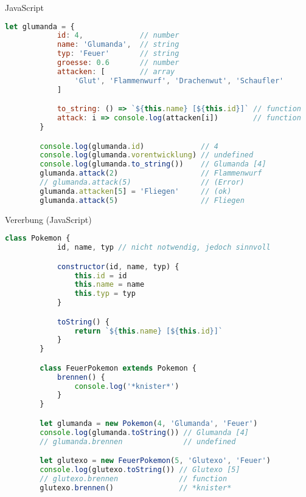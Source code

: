\begin{example}{JavaScript}
    \begin{lstlisting}[language=JavaScript]
        let glumanda = {
            id: 4,             // number
            name: 'Glumanda',  // string
            typ: 'Feuer'       // string
            groesse: 0.6       // number
            attacken: [        // array
                'Glut', 'Flammenwurf', 'Drachenwut', 'Schaufler'
            ]

            to_string: () => `${this.name} [${this.id}]` // function
            attack: i => console.log(attacken[i])        // function
        }

        console.log(glumanda.id)             // 4
        console.log(glumanda.vorentwicklung) // undefined
        console.log(glumanda.to_string())    // Glumanda [4]
        glumanda.attack(2)                   // Flammenwurf
        // glumanda.attack(5)                // (Error)
        glumanda.attacken[5] = 'Fliegen'     // (ok)
        glumanda.attack(5)                   // Fliegen
    \end{lstlisting}
\end{example}

\begin{example}{Vererbung (JavaScript)}
    \begin{lstlisting}[language=JavaScript]
        class Pokemon {
            id, name, typ // nicht notwendig, jedoch sinnvoll

            constructor(id, name, typ) {
                this.id = id
                this.name = name
                this.typ = typ
            }

            toString() {
                return `${this.name} [${this.id}]`
            }
        }

        class FeuerPokemon extends Pokemon {
            brennen() {
                console.log('*knister*')
            }
        }

        let glumanda = new Pokemon(4, 'Glumanda', 'Feuer')
        console.log(glumanda.toString()) // Glumanda [4]
        // glumanda.brennen              // undefined

        let glutexo = new FeuerPokemon(5, 'Glutexo', 'Feuer')
        console.log(glutexo.toString()) // Glutexo [5]
        // glutexo.brennen              // function
        glutexo.brennen()               // *knister*
    \end{lstlisting}
\end{example}


